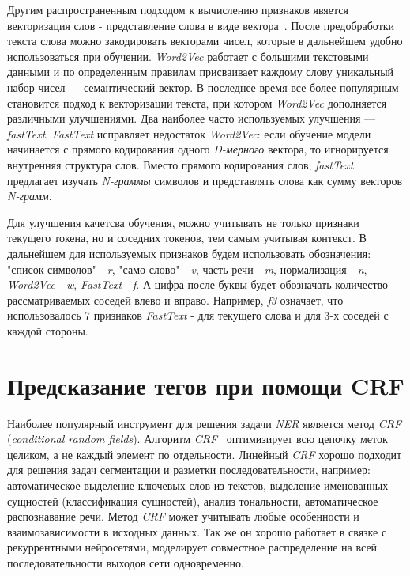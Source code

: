\documentclass{csmathnotes}
\begin{document}
 
Другим распространенным подходом к вычислению признаков явяется векторизация слов -  представление слова в виде вектора~\cite{w2v}.
После предобработки текста слова можно закодировать векторами чисел, которые в дальнейшем удобно использоваться при обучении.
\emph{Word2Vec} работает с большими текстовыми данными и по определенным правилам присваивает каждому слову уникальный набор чисел — семантический вектор. В последнее время все более популярным становится подход к векторизации текста, при котором \emph{Word2Vec} дополняется различными улучшениями. Два наиболее часто используемых улучшения — \emph{fastText}. \emph{FastText} исправляет недостаток \emph{Word2Vec}: если обучение модели начинается с прямого кодирования одного \emph{D-мерного} вектора, то игнорируется внутренняя структура слов. Вместо прямого кодирования слов, \emph{fastText} предлагает изучать \emph{N-граммы} символов и представлять слова как сумму векторов \emph{N-грамм}.


Для улучшения качетсва обучения, можно учитывать не только признаки текущего токена, но и соседних токенов, тем самым учитывая контекст.
В дальнейшем для используемых признаков будем использовать обозначения: "список символов" - \emph{r}, "само слово" - \emph{v}, часть речи - \emph{m}, нормализация - \emph{n}, \emph{Word2Vec} - \emph{w}, \emph{FastText} - \emph{f}.
А цифра после буквы будет обозначать количество рассматриваемых соседей влево и вправо.
Например, \emph{f3} означает, что использовалось 7 признаков \emph{FastText} - для текущего слова и для 3-х соседей с каждой стороны.

\section*{Предсказание тегов при помощи CRF}
Наиболее  популярный инструмент для решения задачи \emph{NER} является метод \emph{CRF} (\emph{conditional random fields}). 
Алгоритм \emph{CRF}~\cite{HabrCRF} оптимизирует всю цепочку меток целиком, а не каждый элемент по отдельности.
Линейный \emph{CRF} хорошо подходит для решения задач сегментации и разметки последовательности,
например: автоматическое выделение ключевых слов из текстов, выделение именованных сущностей (классификация сущностей), анализ тональности, автоматическое распознавание речи.
Метод \emph{CRF} может учитывать любые особенности и взаимозависимости в исходных данных. Так же он хорошо работает в связке с рекуррентными нейросетями, моделирует совместное распределение на всей последовательности выходов сети одновременно.
\end{document}
